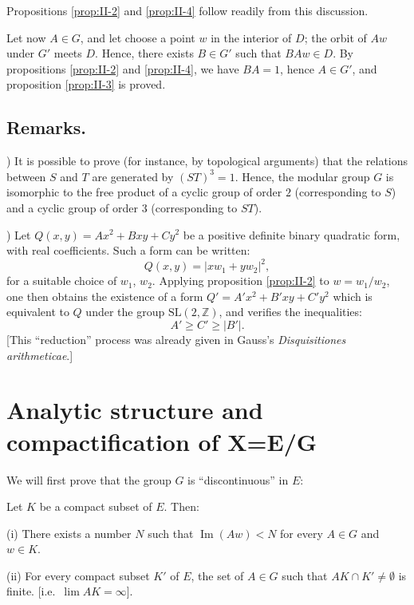 Propositions \ref{prop:II-2} and \ref{prop:II-4} follow readily from this
discussion.

Let now $A\in G$, and let choose a point $w$ in the interior of $D$; the
orbit of $Aw$ under $G'$ meets $D$. Hence, there exists $B\in G'$ such
that $BAw\in D$. By propositions \ref{prop:II-2} and \ref{prop:II-4}, we
have $BA=1$, hence $A\in G'$, and proposition \ref{prop:II-3} is proved.

\subsection*{Remarks.}

) It is possible to prove (for instance, by topological arguments) that
the relations between $S$ and $T$ are generated by $(ST)^{3}=1$. Hence,
the modular group $G$ is isomorphic to the free product of a cyclic group
of order $2$ (corresponding to $S$) and a cyclic group of order $3$
(corresponding to $ST$).

\medskip{}) Let $Q(x,y)=Ax^{2}+Bxy+Cy^{2}$ be a positive definite binary quadratic
form, with real coefficients. Such a form can be written:
\[
Q(x,y)=|xw_{1}+yw_{2}|^{2},
\]
for a suitable choice of $w_{1}$, $w_{2}$. Applying proposition
\ref{prop:II-2} to $w=w_{1}/w_{2}$, one then obtains the existence of a
form $Q'=A'x^{2}+B'xy+C'y^{2}$ which is equivalent to $Q$ under the group
$\mathrm{SL}(2,\mathbb{Z})$, and verifies the inequalities:
\[
A'\geq C'\geq|B'|.
\]
[This ``reduction'' process was already given in Gauss's
\emph{Disquisitiones arithmeticae}.]

\section{Analytic structure and compactification of X=E/G}\label{sec:II-analytic}

We will first prove that the group $G$ is ``discontinuous'' in $E$:

\begin{proposition}\label{prop:II-5}
Let $K$ be a compact subset of $E$. Then:

(i) There exists a number $N$ such that $\operatorname{Im}(Aw)<N$ for
every $A\in G$ and $w\in K$.

(ii) For every compact subset $K'$ of $E$, the set of $A\in G$ such that
$AK\cap K'\neq\emptyset$ is finite. [i.e.\ $\lim AK=\infty$].
\end{proposition}

